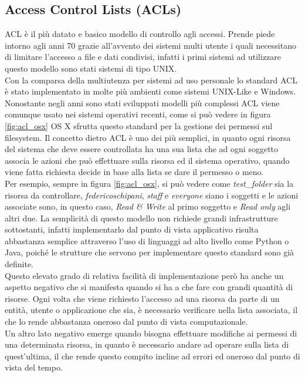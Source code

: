 \subsection*{Access Control Lists (ACLs)}
\label{sub:ACL}

ACL è il più datato e basico modello di controllo agli accessi. Prende piede intorno agli anni 70
grazie all'avvento dei sistemi multi utente i quali necessitano di limitare l'accesso a file e dati condivisi, infatti i primi sistemi ad utilizzare questo modello sono stati sistemi di tipo UNIX.\\
Con la comparsa della multiutenza per sistemi ad uso personale lo standard ACL è stato implementato in molte più ambienti come sistemi UNIX-Like e Windows.\\

Nonostante negli anni sono stati sviluppati modelli più complessi ACL viene comunque usato nei sistemi operativi recenti, come si può vedere in figura \ref{fig:acl_osx} OS X sfrutta questo standard per la gestione dei permessi sul filesystem.
Il concetto dietro ACL è uno dei più semplici, in quanto ogni risorsa del sistema che deve essere controllata ha una sua lista che ad ogni soggetto associa le azioni che può effettuare sulla risorsa ed il sistema operativo, quando viene fatta richiesta decide in base alla lista se dare il permesso o meno.\\
Per esempio, sempre in figura \ref{fig:acl_osx}, si può vedere come \textit{test\_folder} sia la risorsa da controllare, \textit{federicoschipani}, \textit{staff} e \textit{everyone} siano i soggetti e le azioni associate sono, in questo caso, \textit{Read \& Write} al primo soggetto e \textit{Read only} agli altri due.
La semplicità di questo modello non richiede grandi infrastrutture sottostanti, infatti implementarlo dal punto di vista applicativo risulta abbastanza semplice attraverso l'uso di linguaggi ad alto livello come Python o Java, poiché le strutture che servono per implementare questo standard sono già definite.\\
Questo elevato grado di relativa facilità di implementazione però ha anche un aspetto negativo che si manifesta quando si ha a che fare con grandi quantità di risorse. Ogni volta che viene richiesto l'accesso ad una risorsa da parte di un entità, utente o applicazione che sia, è necessario verificare nella lista associata, il che lo rende abbastanza oneroso dal punto di vista computazionale.\\
Un altro lato negativo emerge quando bisogna effettuare modifiche ai permessi di una determinata risorsa, in quanto è necessario andare ad operare sulla lista di quest'ultima, il che rende questo compito incline ad errori ed oneroso dal punto di vista del tempo.


